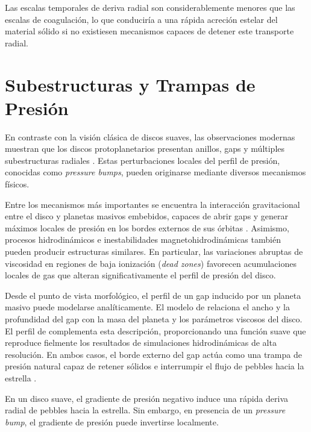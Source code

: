 Las escalas temporales de deriva radial son considerablemente menores que las escalas de coagulación, lo que conduciría a una rápida acreción estelar del material sólido si no existiesen mecanismos capaces de detener este transporte radial.



\section{Subestructuras y Trampas de Presión}
\label{sec:subestructuras}


En contraste con la visión clásica de discos suaves, las observaciones modernas muestran que los discos protoplanetarios presentan anillos, gaps y múltiples subestructuras radiales \citep{ALMAPartnership2015, Andrews2018}. Estas perturbaciones locales del perfil de presión, conocidas como \textit{pressure bumps}, pueden originarse mediante diversos mecanismos físicos.

Entre los mecanismos más importantes se encuentra la interacción gravitacional entre el disco y planetas masivos embebidos, capaces de abrir gaps y generar máximos locales de presión en los bordes externos de sus órbitas \citep{Kanagawa2016}. Asimismo, procesos hidrodinámicos e inestabilidades magnetohidrodinámicas también pueden producir estructuras similares. En particular, las variaciones abruptas de viscosidad en regiones de baja ionización (\textit{dead zones}) favorecen acumulaciones locales de gas que alteran significativamente el perfil de presión del disco.

Desde el punto de vista morfológico, el perfil de un gap inducido por un planeta masivo puede modelarse analíticamente. El modelo de \citet{Kanagawa2016} relaciona el ancho y la profundidad del gap con la masa del planeta y los parámetros viscosos del disco. El perfil de \citet{Duffell2020} complementa esta descripción, proporcionando una función suave que reproduce fielmente los resultados de simulaciones hidrodinámicas de alta resolución. En ambos casos, el borde externo del gap actúa como una trampa de presión natural capaz de retener sólidos e interrumpir el flujo de pebbles hacia la estrella \citep{Pinilla2012, Baruteau2019}.


En un disco suave, el gradiente de presión negativo induce una rápida deriva radial de pebbles hacia la estrella. Sin embargo, en presencia de un \textit{pressure bump}, el gradiente de presión puede invertirse localmente.

